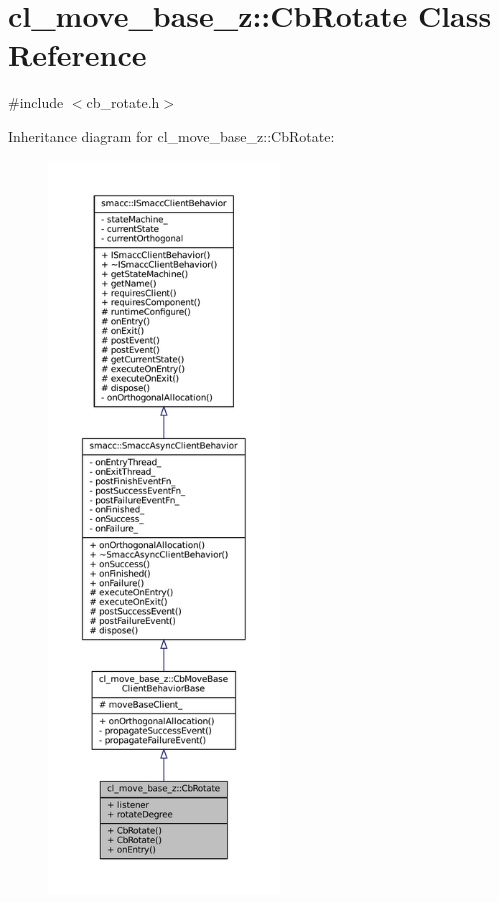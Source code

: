 \hypertarget{classcl__move__base__z_1_1CbRotate}{}\section{cl\+\_\+move\+\_\+base\+\_\+z\+:\+:Cb\+Rotate Class Reference}
\label{classcl__move__base__z_1_1CbRotate}


{\ttfamily \#include $<$cb\+\_\+rotate.\+h$>$}



Inheritance diagram for cl\+\_\+move\+\_\+base\+\_\+z\+:\+:Cb\+Rotate\+:
\nopagebreak
\begin{figure}[H]
\begin{center}
\leavevmode
\includegraphics[height=550pt]{classcl__move__base__z_1_1CbRotate__inherit__graph}
\end{center}
\end{figure}


